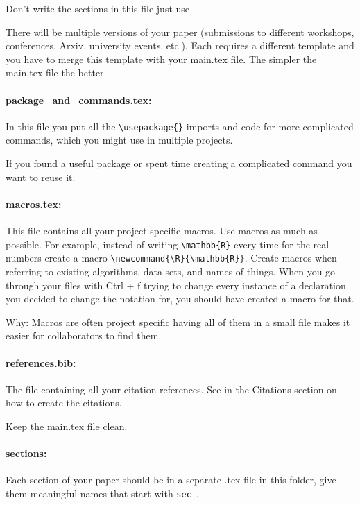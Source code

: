	Don't write the sections in this file just use
	 \verb||.
	
	\why There will be multiple versions of your paper (submissions to different workshops, conferences, Arxiv, university events, etc.). Each requires a different template and you have to merge this template with your main.tex file. The simpler the main.tex file the better.
	
	\paragraph{package\_and\_commands.tex:} In this file you put all the \verb|\usepackage{}| imports and code for more complicated commands, which you might use in multiple projects.
	
	\why If you found a useful package or spent time creating a complicated command you want to reuse it.
	
	\paragraph{macros.tex:} This file contains all your project-specific macros. Use macros as much as possible. For example, instead of writing \verb|\mathbb{R}| every time for the real numbers create a macro \verb|\newcommand{\R}{\mathbb{R}}|. Create macros when referring to existing algorithms, data sets, and names of things. When you go through your files with Ctrl + f trying to change every instance of a declaration you decided to change the notation for, you should have created a macro for that.
	
	Why: Macros are often project specific having all of them in a small file makes it easier for collaborators to find them.
	
	\paragraph{references.bib:} The file containing all your citation references. See in the Citations section on how to create the citations.
	
	\why Keep the main.tex file clean.
	
	\paragraph{sections:} Each section of your paper should be in a separate .tex-file in this folder, give them meaningful names that start with \verb|sec_|.
	
